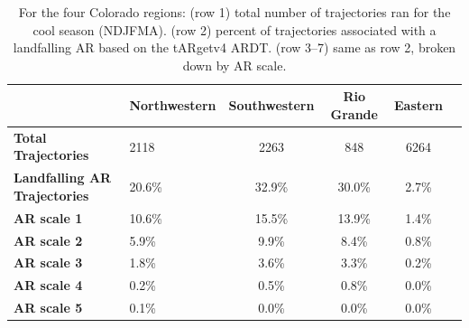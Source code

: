 \documentclass[draft]{agujournal2019}
\begin{document}

\begin{table}[htbp]
\caption{For the four Colorado regions: (row 1) total number of trajectories ran for the cool season (NDJFMA).
        (row 2) percent of trajectories associated with a landfalling AR based on the 
        tARgetv4 ARDT. 
        (row 3--7) same as row 2, broken down by AR scale.}
\label{table:NDJFMAtARget}
\begin{tabular}{lp{2cm}cccc}
\toprule
 & Northwestern & Southwestern & Rio Grande & Eastern \\
\midrule
\textbf{Total Trajectories} & 2118 & 2263 & 848 & 6264 \\
\textbf{Landfalling AR Trajectories} & 20.6\% & 32.9\% & 30.0\% & 2.7\% \\
\textbf{AR scale 1} & 10.6\% & 15.5\% & 13.9\% & 1.4\% \\
\textbf{AR scale 2} & 5.9\% & 9.9\% & 8.4\% & 0.8\% \\
\textbf{AR scale 3} & 1.8\% & 3.6\% & 3.3\% & 0.2\% \\
\textbf{AR scale 4} & 0.2\% & 0.5\% & 0.8\% & 0.0\% \\
\textbf{AR scale 5} & 0.1\% & 0.0\% & 0.0\% & 0.0\% \\
\bottomrule
\end{tabular}
\end{table}
\end{document}
